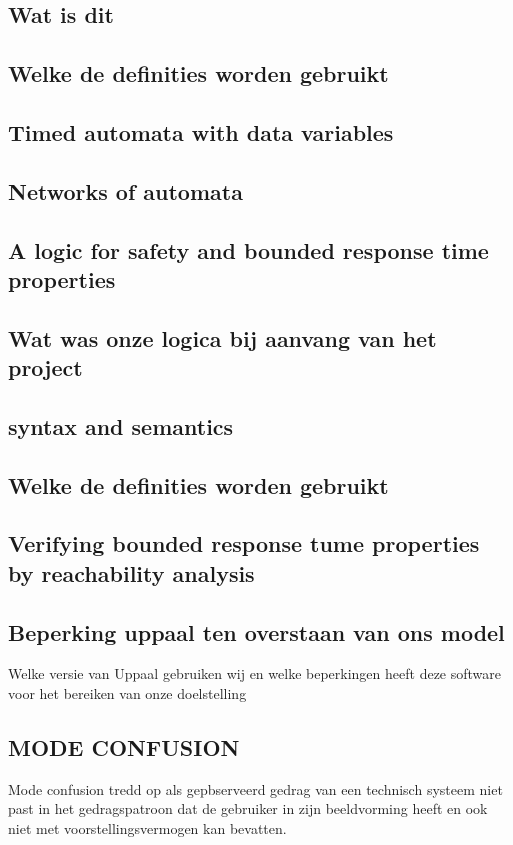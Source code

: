 \subsection{Wat is dit}

\subsection{Welke de definities worden gebruikt}

\subsection{Timed automata with data variables}
\subsection{Networks of automata}

\subsection{A logic for safety and bounded response time properties}

\subsection{Wat was onze logica bij aanvang van het project}

\subsection{syntax and semantics}
\subsection{Welke de definities worden gebruikt}
\subsection{Verifying bounded response tume properties by reachability analysis}
\subsection{Beperking uppaal ten overstaan van ons model}
Welke versie van Uppaal gebruiken wij en welke beperkingen heeft deze software voor het bereiken van onze doelstelling

\subsection{MODE CONFUSION }
Mode confusion tredd op als gepbserveerd gedrag van een technisch systeem niet past in het gedragspatroon dat de gebruiker in zijn beeldvorming heeft  en ook niet met voorstellingsvermogen kan bevatten.
